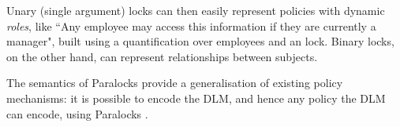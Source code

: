 Unary (single argument) locks can then easily represent policies with dynamic \textit{roles}, like ``Any employee may access this information if they are currently a manager", built using a quantification over employees and an  lock. Binary locks, on the other hand, can represent relationships between subjects.

The semantics of Paralocks provide a generalisation of existing policy mechanisms: it is possible to encode the DLM, and hence any policy the DLM can encode, using Paralocks \cite{broberg2010paralocks}.
%
%
%
%
%
%
%
%

%
%
%
%
%




%
%



